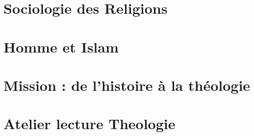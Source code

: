\documentclass[oneside,10pt]{book}
\begin{document}
 







\setcounter{page}{1}
 



%
%

% 
%
%
%

%
%

% 
 
 
 
 
\part{Sociologie des Religions}
 
 
 
 \part{Homme et Islam}
 
 
 \part{Mission : de l'histoire à la théologie}
 
 
 
 
 
  \part{Atelier lecture Theologie}
 
 
 


%

%
\end{document}
